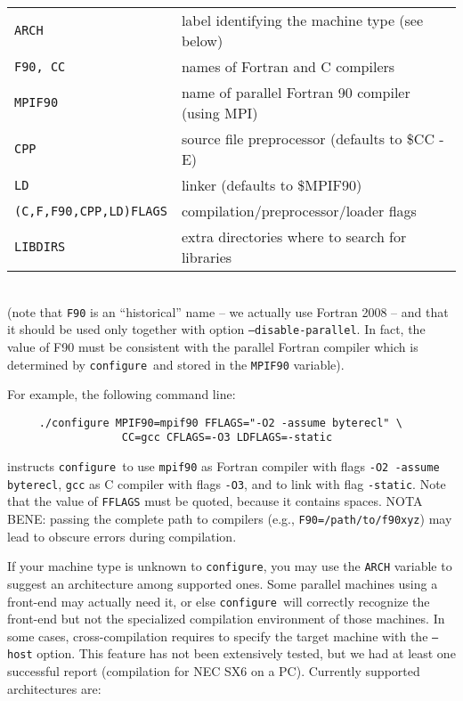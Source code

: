 \documentclass[12pt,a4paper]{article}
\def\configure{\texttt{configure}}
\begin{document}
\begin{tabular}{ll}
\texttt{ARCH}& label identifying the machine type (see below)\\
\texttt{F90, CC} &names of Fortran and C compilers\\
\texttt{MPIF90} &       name of parallel Fortran 90 compiler (using MPI)\\
\texttt{CPP} &          source file preprocessor (defaults to \$CC -E)\\
\texttt{LD} &           linker (defaults to \$MPIF90)\\
\texttt{(C,F,F90,CPP,LD)FLAGS}& compilation/preprocessor/loader flags\\
\texttt{LIBDIRS}&     extra directories where to search for libraries\\
\end{tabular}\\
(note that \texttt{F90} is an ``historical'' name -- we actually use
Fortran 2008 -- and that it should be used only together with option
\texttt{--disable-parallel}. In fact, the value of F90 must be
consistent with the parallel Fortran compiler which is determined by
\configure\ and stored in the \texttt{MPIF90} variable).

For example, the following command line:
\begin{verbatim}
     ./configure MPIF90=mpif90 FFLAGS="-O2 -assume byterecl" \
                  CC=gcc CFLAGS=-O3 LDFLAGS=-static
\end{verbatim}
instructs \configure\ to use \texttt{mpif90} as Fortran compiler
with flags \texttt{-O2 -assume byterecl}, \texttt{gcc} as C compiler with
flags \texttt{-O3}, and to link with flag \texttt{-static}.
Note that the value of \texttt{FFLAGS} must be quoted, because it contains
spaces. NOTA BENE: passing the complete path to compilers (e.g.,
\texttt{F90=/path/to/f90xyz}) may lead to obscure errors during
compilation.

If your machine type is unknown to \configure, you may use the
\texttt{ARCH}
variable to suggest an architecture among supported ones. Some 
parallel machines using a front-end may actually
need it, or else \configure\ will correctly recognize the front-end
but not the specialized compilation environment of those machines.
In some cases, cross-compilation requires to specify the target machine
with the \texttt{--host} option. This feature has not been extensively
tested, but we had at least one successful report (compilation
for NEC SX6 on a PC). Currently supported architectures are:
\end{document}
